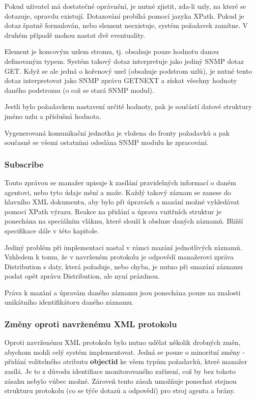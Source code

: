 Pokud uživatel má dostatečné oprávnění, je nutné zjistit, zda-li uzly, na které se dotazuje, opravdu existují. Dotazování probíhá pomocí jazyka XPath.
Pokud je dotaz špatně formulován, nebo element neexistuje, systém požadavek zamítne. V druhém případě mohou nastat dvě eventuality.

Element je koncovým uzlem stromu, tj. obsahuje pouze hodnotu danou definovaným typem. Systém takový dotaz interpretuje jako jediný SNMP dotaz GET.
Když se ale jedná o kořenový uzel (obsahuje podstrom uzlů), je nutné tento dotaz interpretovat jako
SNMP zprávu GETNEXT a získat všechny hodnoty daného podstromu (o což se stará SNMP modul).

Jestli bylo požadavkem nastavení určité hodnoty, pak je součástí datové struktury jméno uzlu a příslušná hodnota.

Vygenerovaná komunikační jednotka je vložena do fronty požadavků a pak současně se všemi ostatními odeslána SNMP modulu ke zpracování.

\subsubsection*{Subscribe}
Touto zprávou se manažer upisuje k zasílání pravidelných informací o daném agentovi, nebo tyto údaje mění a maže. Každý takový záznam
se zanese do hlavního XML dokumentu, aby bylo při úpravách a mazání možné vyhledávat pomocí XPath výrazu. Reakce na přidání a úprava
vnitřních struktur je ponechána na speciálním vláknu, které slouží k obsluze daných záznamů. Bližší specifikace dále v této kapitole.

Jediný problém při implementaci nastal v rámci mazání jednotlivých záznamů. Vzhledem k tomu, že v navrženém protokolu je odpovědí
manažerovi zpráva Distribution s daty, která požaduje, nebo chyba, je nutno při smazání záznamu poslat opět zprávu Distribution, ale nyní
prázdnou.

Práva k mazání a úpravám daného záznamu jsou ponechána pouze na znalosti unikátního identifikátoru daného záznamu. 


\subsubsection*{Změny oproti navrženému XML protokolu}
Oproti navrženému XML protokolu bylo nutno udělat několik drobných změn, abychom mohli celý systém implementovat. Jedná se pouze o
minoritní změny - přidání volitelného atributu \textbf{objectid} ke všem typům požadavků, které manažer zasílá. Je to z důvodu
identifiace monitorovaného zařízení, což by bez tohoto zásahu nebylo vůbec možné. Zároveň tento zásah umožňuje ponechat stejnou
strukturu protokolu (co se týče dotazů a odpovědí) pro stroj agenta a brány. 

